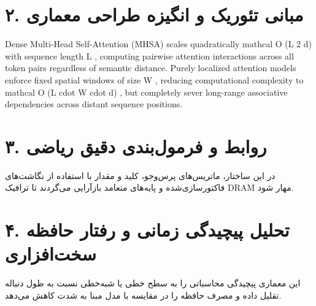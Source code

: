 \documentclass[12pt,a4paper]{article}
\begin{document}
\section*{۲. مبانی تئوریک و انگیزه طراحی معماری}
Dense Multi-Head Self-Attention (MHSA) scales quadratically mathcal O (L 2 d) with sequence length L , computing pairwise attention interactions across all token pairs regardless of semantic distance. Purely localized attention models enforce fixed spatial windows of size W , reducing computational complexity to mathcal O (L cdot W cdot d) , but completely sever long-range associative dependencies across distant sequence positions.

\section*{۳. روابط و فرمول‌بندی دقیق ریاضی}
در این ساختار، ماتریس‌های پرس‌وجو، کلید و مقدار با استفاده از نگاشت‌های فاکتورسازی‌شده و پایه‌های متعامد بازآرایی می‌گردند تا ترافیک DRAM مهار شود.

\section*{۴. تحلیل پیچیدگی زمانی و رفتار حافظه سخت‌افزاری}
این معماری پیچیدگی محاسباتی را به سطح خطی یا شبه‌خطی نسبت به طول دنباله تقلیل داده و مصرف حافظه را در مقایسه با مدل مبنا به شدت کاهش می‌دهد.
\end{document}
